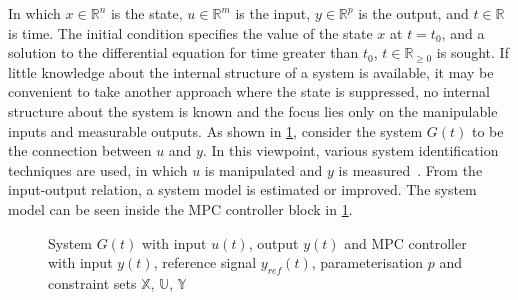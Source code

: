In which $x \in \mathbb{R}^n $ is the state, $u \in \mathbb{R}^m$ is the input, $y \in \mathbb{R}^p$ is the output, and $t \in \mathbb{R}$ is time. The initial condition specifies the value of the state $x$ at $t = t_0$, and a solution to the differential equation for time greater than $t_0$, $t \in \mathbb{R}_{\geq 0}$ is sought. If little knowledge about the internal structure of a system is available, it may be convenient to take another approach where the state is suppressed, no internal structure about the system is known and the focus lies only on the manipulable inputs and measurable outputs. As shown in \cref{figure: mpc_block_diagam}, consider the system $G(t)$ to be
the connection between $u$ and $y$. In this viewpoint, various system identification techniques are used, in which $u$ is manipulated and $y$ is measured~\cite{rawlings_model_2020}. From the input-output relation, a system model is estimated or improved. The system model can be seen inside the \ac{MPC} controller block in \cref{figure: mpc_block_diagam}.\\

\begin{figure}[H]
\centering
{}
\caption{System $G(t)$ with input ${u}(t)$, output $y(t)$ and \acs{MPC} controller with input $y(t)$, reference signal $y_{ref}(t)$, parameterisation $p$ and constraint sets $\mathbb{X}$, $\mathbb{U}$, $\mathbb{Y}$} \label{figure: mpc_block_diagam} \end{figure}  


